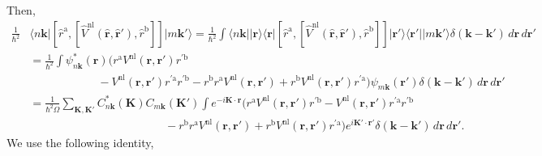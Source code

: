 Then,
\begin{align}\label{3.5}
\frac{1}{\hbar^{2}}&
\langle n\mathbf{k}\vert 
\left[
\hat{r}^{\mathrm{a}},
\left[
\hat{V}^\mathrm{nl}(\hat{\mathbf{r}},\hat{\mathbf{r}}'),\hat{r}^\mathrm{b}
\right]
\right]
\vert m\mathbf{k}'\rangle
= \frac{1}{\hbar^{2}}
\int \langle n\mathbf{k}\vert \vert\mathbf{r}\rangle\langle\mathbf{r}\vert 
\left[
\hat{r}^{\mathrm{a}},
\left[
\hat{V}^\mathrm{nl}(\hat{\mathbf{r}},\hat{\mathbf{r}}'),\hat{r}^\mathrm{b}
\right]
\right]
\vert\mathbf{r}'\rangle\langle\mathbf{r}'\vert \vert m\mathbf{k}'\rangle
\delta(\mathbf{k}-\mathbf{k}')\,d\mathbf{r}\,d\mathbf{r}'\nonumber\\
&= \frac{1}{\hbar^{2}}
\int \psi^{*}_{n\mathbf{k}}(\mathbf{r})
\Big(
  r^{\mathrm{a}}V^\mathrm{nl}(\mathbf{r},\mathbf{r}')r^{\prime\mathrm{b}}\nonumber\\
&\qquad\qquad\qquad- V^\mathrm{nl}(\mathbf{r},\mathbf{r}')r^{\prime\mathrm{a}}r^{\prime\mathrm{b}}
- r^\mathrm{b}r^{\mathrm{a}}V^\mathrm{nl}(\mathbf{r},\mathbf{r}')
+ r^\mathrm{b}V^\mathrm{nl}(\mathbf{r},\mathbf{r}')r^{\prime\mathrm{a}}
\Big)
\psi_{m\mathbf{k}}(\mathbf{r}')
\delta(\mathbf{k}-\mathbf{k}')\,d\mathbf{r}\,d\mathbf{r}'\nonumber\\
&= \frac{1}{\hbar^{2}\Omega}
\sum_{\mathbf{K},\mathbf{K}'}
C^{*}_{n\mathbf{k}}(\mathbf{K})C_{m\mathbf{k}}(\mathbf{K}')
\int e^{-i\mathbf{K}\cdot\mathbf{r}}
\Big(
  r^{\mathrm{a}}V^\mathrm{nl}(\mathbf{r},\mathbf{r}')r^{\prime\mathrm{b}}
- V^\mathrm{nl}(\mathbf{r},\mathbf{r}')r^{\prime\mathrm{a}}r^{\prime\mathrm{b}}
\nonumber\\
&\hspace{5cm} -
  r^\mathrm{b}r^{\mathrm{a}}V^\mathrm{nl}(\mathbf{r},\mathbf{r}')
+ r^\mathrm{b}V^\mathrm{nl}(\mathbf{r},\mathbf{r}')r^{\prime\mathrm{a}}
\Big) 
e^{i\mathbf{K}'\cdot\mathbf{r}'}
\delta(\mathbf{k}-\mathbf{k}')\,d\mathbf{r}\,d\mathbf{r}'.
\end{align} 
We use the following identity,
